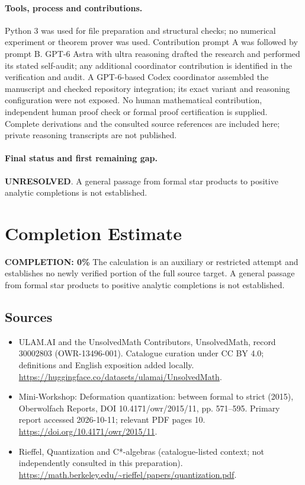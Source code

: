 \documentclass[11pt]{article}
\begin{document}
\paragraph{Tools, process and contributions.}
Python 3 was used for file preparation and structural checks; no numerical experiment or theorem prover was used. Contribution prompt A was followed by prompt B. GPT-6 Astra with ultra reasoning drafted the research and performed its stated self-audit; any additional coordinator contribution is identified in the verification and audit. A GPT-6-based Codex coordinator assembled the manuscript and checked repository integration; its exact variant and reasoning configuration were not exposed. No human mathematical contribution, independent human proof check or formal proof certification is supplied. Complete derivations and the consulted source references are included here; private reasoning transcripts are not published.

\paragraph{Final status and first remaining gap.}
\textbf{UNRESOLVED}. A general passage from formal star products to positive analytic completions is not established.

\section{Completion Estimate}
\noindent\textbf{COMPLETION: 0\%}
The calculation is an auxiliary or restricted attempt and establishes no newly verified portion of the full source target. A general passage from formal star products to positive analytic completions is not established.

\subsection{Sources}
\begin{itemize}
\item[\hypertarget{source:30002803:1}{S1}] ULAM.AI and the UnsolvedMath Contributors, UnsolvedMath, record 30002803 (OWR-13496-001). Catalogue curation under CC BY 4.0; definitions and English exposition added locally.
\url{https://huggingface.co/datasets/ulamai/UnsolvedMath}.
\item[\hypertarget{source:30002803:2}{S2}] Mini-Workshop: Deformation quantization: between formal to strict (2015), Oberwolfach Reports, DOI 10.4171/owr/2015/11, pp. 571--595. Primary report accessed 2026-10-11; relevant PDF pages 10.
\url{https://doi.org/10.4171/owr/2015/11}.
\item[\hypertarget{source:30002803:3}{S3}] Rieffel, Quantization and C*-algebras (catalogue-listed context; not independently consulted in this preparation).
\url{https://math.berkeley.edu/~rieffel/papers/quantization.pdf}.
\end{itemize}
\label{end:30002803}
\end{document}
